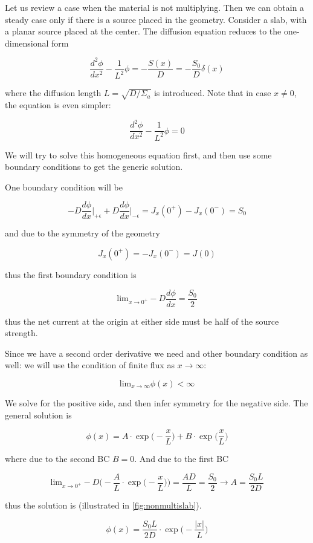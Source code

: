 Let us review a case when the material is not multiplying. Then we can obtain a steady case only if there is a source placed in the geometry. Consider a slab, with a planar source placed at the center. The diffusion equation reduces to the one-dimensional form

$$\frac{d^2\phi}{dx^2}-\frac{1}{L^2}\phi=-\frac{S(x)}{D}=-\frac{S_0}{D}\delta(x)$$

where the diffusion length $L=\sqrt{D/\Sigma_a}$ is introduced. Note that in case $x\neq 0$, the equation is even simpler:

$$\frac{d^2\phi}{dx^2}-\frac{1}{L^2}\phi=0$$

We will try to solve this homogeneous equation first, and then use some boundary conditions to get the generic solution.

One boundary condition will be

$$-D\frac{d\phi}{dx}\rvert_{+\epsilon}+D\frac{d\phi}{dx}\rvert_{-\epsilon}=J_x(0^+)-J_x(0^-)=S_0$$

and due to the symmetry of the geometry

$$J_x(0^+)=-J_x(0^-)=J(0)$$

thus the first boundary condition is

$$\mathrm{lim}_{x\rightarrow 0^+} -D\frac{d\phi}{dx}=\frac{S_0}{2}$$

\noindent thus the net current at the origin at either side must be half of the source strength.

Since we have a second order derivative we need and other boundary condition as well: we will use the condition of finite flux as $x\rightarrow \infty$:

$$\mathrm{lim}_{x\rightarrow \infty} \phi(x) < \infty$$

We solve for the positive side, and then infer symmetry for the negative side. The general solution is

$$\phi(x)=A\cdot\exp\Big(-\frac{x}{L}\Big)+B\cdot\exp\Big(\frac{x}{L}\Big)$$

\noindent where due to the second BC $B=0$. And due to the first BC

$$\mathrm{lim}_{x\rightarrow 0^+} -D\Bigg(-\frac{A}{L}\cdot\exp\Big(-\frac{x}{L}\Big)\Bigg)=\frac{AD}{L}=\frac{S_0}{2} \rightarrow A=\frac{S_0L}{2D}$$

\noindent thus the solution is (illustrated in \autoref{fig:nonmultislab}).

$$\phi(x)=\frac{S_0L}{2D}\cdot\exp\Big(-\frac{|x|}{L}\Big)$$


